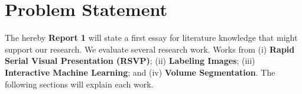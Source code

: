 \section{Problem Statement}

The hereby \textbf{Report 1} will state a first essay for literature knowledge that might support our research. We evaluate several research work. Works from (i) \textbf{Rapid Serial Visual Presentation (RSVP)}; (ii) \textbf{Labeling Images}; (iii) \textbf{Interactive Machine Learning}; and (iv) \textbf{Volume Segmentation}. The following sections will explain each work.